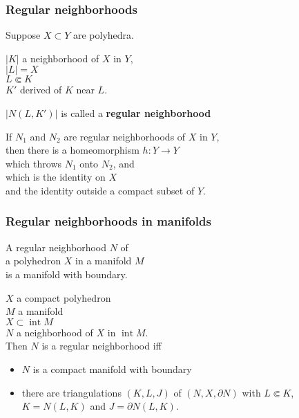 \documentclass[14pt]{beamer}
\newcommand{\fullsubcomplex}{\Subset}
\DeclareMathOperator{\interior}{int}
\newcommand{\setbackgroundpicture}[1]{%
\usebackgroundtemplate{
\begin{pgfpicture}{0in}{0in}{\paperwidth}{\paperheight}
\pgfputat{\pgfxy(0,0)}{\texttt{[image: \#1]}}
\color{white}
\pgfsetfillopacity{0.8}
\pgfrect[fill]{\pgfxy(0,0)}{\pgfpoint{\paperwidth}{\paperheight}}
\end{pgfpicture}
}
}
\begin{document}
\setbackgroundpicture{Bangsar.JPG}
\begin{frame}
\frametitle{Regular neighborhoods}

Suppose $X \subset Y$ are polyhedra.

$|K|$ a neighborhood of $X$ in $Y$, \\
$|L| = X$ \\
$L \fullsubcomplex K$ \\
$K'$ derived of $K$ near $L$.

\vfill
$|N(L,K')|$ is called a \textbf{regular neighborhood} \\

\begin{theorem}
  If $N_1$ and $N_2$ are regular neighborhoods of $X$ in $Y$,\\
  then there is a homeomorphism $h : Y \to Y$ \\
  which throws $N_1$ onto $N_2$, and \\
  which is the identity on $X$ \\
  and the identity outside a compact subset of $Y$.
\end{theorem}

\end{frame}

\begin{frame}
  \frametitle{Regular neighborhoods in manifolds}

  \begin{theorem}
    A regular neighborhood $N$ of \\
    a polyhedron $X$ in a manifold $M$ \\
    is a manifold with boundary.
  \end{theorem}
\end{frame}

\begin{frame}
 \begin{theorem}
    $X$ a compact polyhedron \\
   $M$ a manifold \\
   $X \subset \interior M$ \\
   $N$ a neighborhood of $X$ in $\interior M$. \\
   Then $N$ is a regular neighborhood iff
    \begin{itemize}
      \item $N$ is a compact manifold with boundary
      \item there are triangulations $(K,L,J)$ of $(N,X,\partial N)$
        with $L \fullsubcomplex K$, $K = N(L,K)$ and $J = \partial N(L,K)$.
    \end{itemize}
  \end{theorem}
\end{frame}
\end{document}
